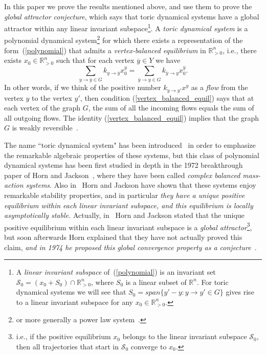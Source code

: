 \documentclass[12pt,letterpaper]{article}
\renewcommand{\S}{\mathcal{S}}
\newcommand{\RR}{\mathbb{R}}
\newcommand{\RRp}{\mathbb{R}_{>0}}
\renewcommand{\bar}{\overline}
\begin{document}
\medskip

In this paper we prove the results mentioned above, and use them to prove the {\em global attractor conjecture}, which says that toric dynamical systems have a global attractor within any linear invariant subspace\footnote{
A {\em linear invariant subspace} of~(\ref{polynomial}) is an invariant set $\S_0 = (x_0 + S_0) \cap \RRp^n$, where $S_0$ is a linear subset of $\RR^n$. For toric dynamical systems we will see that $S_0 = span\{y'-y:y\to y'\in G\}$ gives rise to a linear invariant subspace for any $x_0 \in \RRp^n$.
}.
%
A \emph{toric dynamical system} is a polynomial dynamical system\footnote{or more generally a power law system~\cite{CNP}.
} 
for which there exists a representation of the form~(\ref{polynomial}) that admits a {\em vertex-balanced equilibrium} in $\RR^n_{>0}$, i.e., there exists $x_0\in \RR^n_{>0}$ such that for each vertex $\bar y\in Y$ we have
\begin{equation}\label{vertex_balanced_equil}
\sum_{y \to \bar y \in G} k_{y \to \bar y}x_0^{y}  = 
\sum_{\bar y \to y \in G} k_{\bar y \to y}x_0^{\bar y} .
\end{equation}
%
In other words, if we think of the positive number $k_{y \to y'}x^{y}$ as a {\em flow} from the vertex $y$ to the vertex $y'$, then condition (\ref{vertex_balanced_equil}) says that at each vertex of the graph $G$, the sum of all the incoming flows equals the sum of all outgoing flows. The identity (\ref{vertex_balanced_equil}) implies that the graph $G$ is weakly reversible~\cite{Horn_Jackson}.

The name ``toric dynamical system" has been introduced~\cite{TDS} in order to emphasize the remarkable algebraic properties of these systems, but this class of polynomial dynamical systems has been first studied in depth in the 1972 breakthrough paper of Horn and Jackson~\cite{Horn_Jackson}, where they have been called \emph{complex balanced mass-action systems}. Also in~\cite{Horn_Jackson} Horn and Jackson have shown that these systems enjoy remarkable stability properties, and in particular {\em they have a unique positive equilibrium within each linear invariant subspace, and this equilibrium is locally asymptotically stable.} 
%
Actually,  in~\cite{Horn_Jackson} Horn and Jackson stated that the unique positive equilibrium within each linear invariant subspace is a {\em global attractor}\footnote{
i.e., if the positive equilibrium $x_0$ belongs to the linear invariant subspace $\S_0$, then all trajectories that start in $\S_0$ converge to $x_0$.
}, 
but soon afterwards Horn explained that they have not actually proved this claim, {\em and in 1974 he proposed this global convergence property as a conjecture~\cite{Horn_1974}}. 
\end{document}
